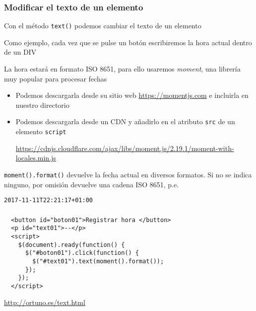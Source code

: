 \documentclass[ucs]{beamer}
\begin{document}
\begin{frame}[fragile]
\frametitle{Modificar el texto de un elemento}
Con el método 
\verb|text()| podemos cambiar el texto de un elemento

Como ejemplo, cada vez que se pulse un botón
escribiremos la hora actual dentro de un DIV

La hora estará en formato ISO 8651, para ello
usaremos \emph{moment}, una librería muy popular para procesar fechas


    \begin{itemize}
    \item
Podemos descargarla desde su sitio web
\url{https://momentjs.com}
e incluirla en nuestro directorio

    \item
Podemos descargarla desde un CDN 
y añadirlo en el atributo \verb|src| de un elemento \verb|script|

\url{https://cdnjs.cloudflare.com/ajax/libs/moment.js/2.19.1/moment-with-locales.min.js}

    \end{itemize}

\verb|moment().format()| devuelve la fecha actual en diversos formatos.
Si no se indica ninguno, por omisión devuelve una cadena ISO 8651, 
p.e.

\verb|2017-11-11T22:21:17+01:00|

\end{frame}


\begin{frame}[fragile]
\frametitle{}
  \begin{scriptsize}
  \begin{verbatim}
  <button id="boton01">Registrar hora </button>
  <p id="text01">--</p>
  <script>
    $(document).ready(function() {
      $("#boton01").click(function() {
        $("#text01").text(moment().format());
      });
    });
  </script>
  \end{verbatim}
  \end{scriptsize}

\begin{tiny}
\begin{flushright}
\url{http://ortuno.es/text.html}
\end{flushright}
\end{tiny}
\end{frame}
\end{document}
